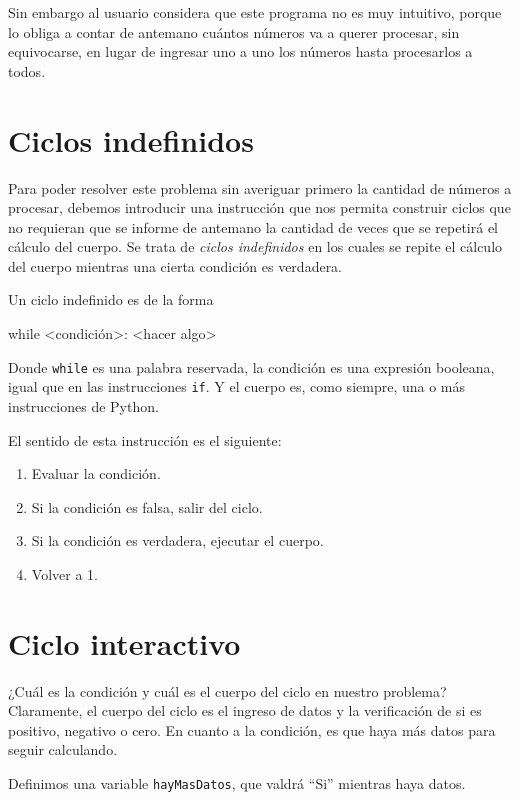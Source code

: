 Sin embargo al usuario considera que este programa no es muy intuitivo, porque
lo obliga a contar de antemano cuántos números va a querer procesar, sin
equivocarse, en lugar de ingresar uno a uno los números hasta procesarlos a
todos.

\section{Ciclos indefinidos}

Para poder resolver este problema sin averiguar primero la cantidad de números
a procesar, debemos introducir una instrucción que nos permita construir ciclos
que no requieran que se informe de antemano la cantidad de veces que se
repetirá el cálculo del cuerpo.  Se trata de {\it ciclos indefinidos} en los
cuales se repite el cálculo del cuerpo mientras una cierta condición es
verdadera.

Un ciclo indefinido es de la forma

\begin{codigo-python-sn}
while <condición>:
    <hacer algo>
\end{codigo-python-sn}

Donde \lstinline+while+ es una palabra reservada, la condición es una expresión
booleana, igual que en las instrucciones \lstinline!if!.  Y el cuerpo es, como
siempre, una o más instrucciones de Python.

El sentido de esta instrucción es el siguiente:

\begin{enumerate}
\item Evaluar la condición.
\item Si la condición es falsa, salir del ciclo.
\item Si la condición es verdadera, ejecutar el cuerpo.
\item Volver a 1.
\end{enumerate}

\section{Ciclo interactivo}

¿Cuál es la condición y cuál es el cuerpo del ciclo en nuestro problema?
Claramente, el cuerpo del ciclo es el ingreso de datos y la verificación de si
es positivo, negativo o cero.  En cuanto a la condición, es que haya más datos
para seguir calculando.

Definimos una variable \lstinline!hayMasDatos!, que valdrá ``Si'' mientras
haya datos.

